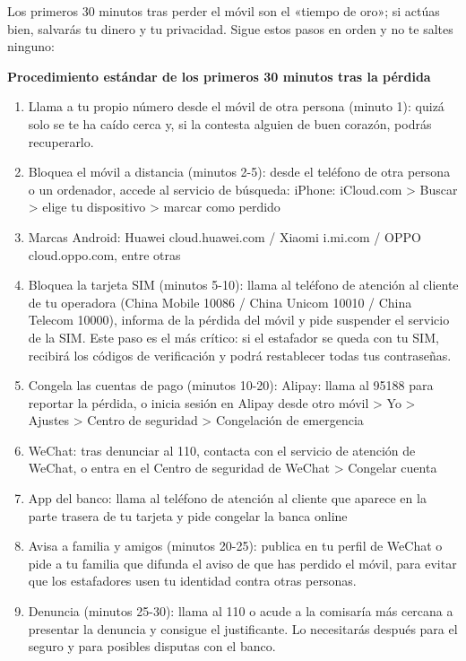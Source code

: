 Los primeros 30 minutos tras perder el móvil son el «tiempo de oro»; si actúas bien, salvarás tu dinero y tu privacidad. Sigue estos pasos en orden y no te saltes ninguno:

\textbf{Procedimiento estándar de los primeros 30 minutos tras la pérdida}\par

\begin{enumerate}
  \item Llama a tu propio número desde el móvil de otra persona (minuto 1): quizá solo se te ha caído cerca y, si la contesta alguien de buen corazón, podrás recuperarlo.
  \item Bloquea el móvil a distancia (minutos 2-5): desde el teléfono de otra persona o un ordenador, accede al servicio de búsqueda: iPhone: iCloud.com > Buscar > elige tu dispositivo > marcar como perdido
  \item Marcas Android: Huawei cloud.huawei.com / Xiaomi i.mi.com / OPPO cloud.oppo.com, entre otras
  \item Bloquea la tarjeta SIM (minutos 5-10): llama al teléfono de atención al cliente de tu operadora (China Mobile 10086 / China Unicom 10010 / China Telecom 10000), informa de la pérdida del móvil y pide suspender el servicio de la SIM. Este paso es el más crítico: si el estafador se queda con tu SIM, recibirá los códigos de verificación y podrá restablecer todas tus contraseñas.
  \item Congela las cuentas de pago (minutos 10-20): Alipay: llama al 95188 para reportar la pérdida, o inicia sesión en Alipay desde otro móvil > Yo > Ajustes > Centro de seguridad > Congelación de emergencia
  \item WeChat: tras denunciar al 110, contacta con el servicio de atención de WeChat, o entra en el Centro de seguridad de WeChat > Congelar cuenta
  \item App del banco: llama al teléfono de atención al cliente que aparece en la parte trasera de tu tarjeta y pide congelar la banca online
  \item Avisa a familia y amigos (minutos 20-25): publica en tu perfil de WeChat o pide a tu familia que difunda el aviso de que has perdido el móvil, para evitar que los estafadores usen tu identidad contra otras personas.
  \item Denuncia (minutos 25-30): llama al 110 o acude a la comisaría más cercana a presentar la denuncia y consigue el justificante. Lo necesitarás después para el seguro y para posibles disputas con el banco.
\end{enumerate}

